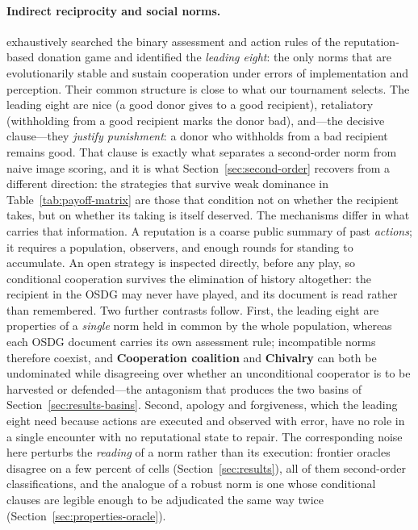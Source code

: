 \documentclass[11pt]{article}
\begin{document}
\paragraph{Indirect reciprocity and social norms.}
\citet{ohtsuki2006leading} exhaustively searched the binary
assessment and action rules of the reputation-based donation game and
identified the \emph{leading eight}: the only norms that are
evolutionarily stable and sustain cooperation under errors of
implementation and perception.
Their common structure is close to what our tournament selects.
The leading eight are nice (a good donor gives to a good recipient),
retaliatory (withholding from a good recipient marks the donor bad),
and---the decisive clause---they \emph{justify punishment}: a donor
who withholds from a bad recipient remains good.
That clause is exactly what separates a second-order norm from naive
image scoring, and it is what Section~\ref{sec:second-order}
recovers from a different direction: the strategies that survive weak
dominance in Table~\ref{tab:payoff-matrix} are those that condition
not on whether the recipient takes, but on whether its taking is
itself deserved.
The mechanisms differ in what carries that information.
A reputation is a coarse public summary of past \emph{actions}; it
requires a population, observers, and enough rounds for standing to
accumulate.
An open strategy is inspected directly, before any play, so
conditional cooperation survives the elimination of history
altogether: the recipient in the OSDG may never have played, and its
document is read rather than remembered.
Two further contrasts follow.
First, the leading eight are properties of a \emph{single} norm held
in common by the whole population, whereas each OSDG document carries
its own assessment rule; incompatible norms therefore coexist, and
\textbf{Cooperation coalition} and \textbf{Chivalry} can both be
undominated while disagreeing over whether an unconditional cooperator
is to be harvested or defended---the antagonism that produces the two
basins of Section~\ref{sec:results-basins}.
Second, apology and forgiveness, which the leading eight need because
actions are executed and observed with error, have no role in a single
encounter with no reputational state to repair.
The corresponding noise here perturbs the \emph{reading} of a norm
rather than its execution: frontier oracles disagree on a few percent
of cells (Section~\ref{sec:results}), all of them second-order
classifications, and the analogue of a robust norm is one whose
conditional clauses are legible enough to be adjudicated the same way
twice (Section~\ref{sec:properties-oracle}).
\end{document}
